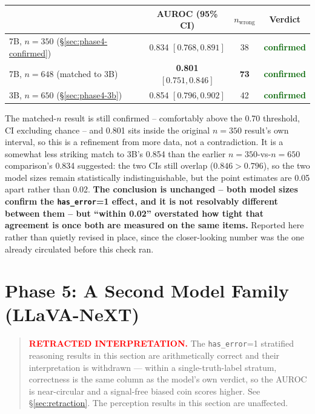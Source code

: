\documentclass[11pt]{article}
\newcommand{\worked}[1]{\textcolor{darkgreen}{\textbf{#1}}}
\begin{document}
\begin{center}
\begin{tabular}{lccc}
\toprule
& AUROC (95\% CI) & $n_{\text{wrong}}$ & Verdict \\
\midrule
7B, $n=350$ (\S\ref{sec:phase4-confirmed}) & 0.834 $[0.768, 0.891]$ & 38 & \worked{confirmed} \\
7B, $n=648$ (matched to 3B) & \textbf{0.801} $[0.751, 0.846]$ & \textbf{73} & \worked{confirmed} \\
3B, $n=650$ (\S\ref{sec:phase4-3b}) & 0.854 $[0.796, 0.902]$ & 42 & \worked{confirmed} \\
\bottomrule
\end{tabular}
\end{center}

The matched-$n$ result is still confirmed -- comfortably above the 0.70
threshold, CI excluding chance -- and 0.801 sits inside the original
$n=350$ result's own interval, so this is a refinement from more data, not
a contradiction. It is a somewhat less striking match to 3B's 0.854 than
the earlier $n=350$-vs-$n=650$ comparison's 0.834 suggested: the two CIs
still overlap ($0.846 > 0.796$), so the two model sizes remain statistically
indistinguishable, but the point estimates are 0.05 apart rather than 0.02.
\textbf{The conclusion is unchanged -- both model sizes confirm the
\texttt{has\_error}=1 effect, and it is not resolvably different between
them -- but ``within 0.02'' overstated how tight that agreement is once
both are measured on the same items.} Reported here rather than quietly
revised in place, since the closer-looking number was the one already
circulated before this check ran.

\section{Phase 5: A Second Model Family (LLaVA-NeXT)}
\label{sec:phase5}

\begin{quote}
\textbf{\textcolor{red}{RETRACTED INTERPRETATION.}} The
\texttt{has\_error}=1 stratified reasoning results in this section are
arithmetically correct and their interpretation is withdrawn --- within a
single-truth-label stratum, correctness is the same column as the model's own
verdict, so the AUROC is near-circular and a signal-free biased coin scores
higher. See \S\ref{sec:retraction}. The perception results in this section
are unaffected.
\end{quote}
\end{document}

